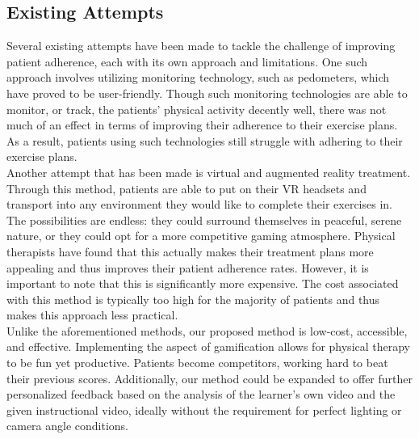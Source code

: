 \subsection{Existing Attempts}
\indent Several existing attempts have been made to tackle the challenge of improving patient adherence, 
each with its own approach and limitations. One such approach involves utilizing monitoring technology, 
such as pedometers, which have proved to be user-friendly. Though such monitoring technologies are 
able to monitor, or track, the patients' physical activity decently well, there was not much of an effect in terms 
of improving their adherence to their exercise plans\cite{Alpher10}. As a result, patients using such technologies still struggle with 
adhering to their exercise plans.
\\
\indent Another attempt that has been made is virtual and augmented reality treatment. Through this method, patients 
are able to put on their VR headsets and transport into any environment they would like to complete their exercises in. 
The possibilities are endless: they could surround themselves in peaceful, serene nature, or they could 
opt for a more competitive gaming atmosphere. Physical therapists have found that this actually 
makes their treatment plans more appealing and thus improves their patient adherence rates\cite{Authors14j}. However, 
it is important to note that this is significantly more expensive. The cost associated with this 
method is typically too high for the majority of patients and thus makes this approach less practical.
\\
\indent Unlike the aforementioned methods, our proposed method is low-cost, accessible, and effective. 
Implementing the aspect of gamification allows for physical therapy to be fun yet productive. Patients become 
competitors, working hard to beat their previous scores. Additionally, our method could be expanded to offer 
further personalized feedback based on the analysis of the learner's own video and the given instructional video, 
ideally without the requirement for perfect lighting or camera angle conditions.

